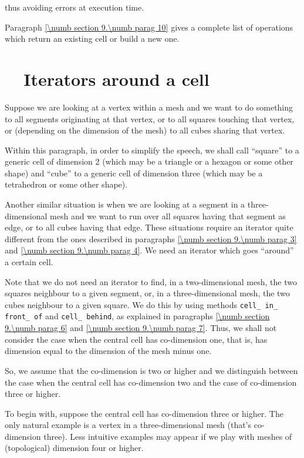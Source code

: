 \noindent thus avoiding errors at execution time.

Paragraph \ref{\numb section 9.\numb parag 10} gives a complete list of operations which return
an existing cell or build a new one.


\section{~~Iterators around a cell}\label{\numb section 9.\numb parag 8}

Suppose we are looking at a vertex within a mesh and we want to do something to all segments
originating at that vertex, or to all squares touching that vertex, or (depending on the
dimension of the mesh) to all cubes sharing that vertex.

Within this paragraph, in order to simplify the speech, we shall call ``square'' to a generic
cell of dimension 2 (which may be a triangle or a hexagon or some other shape) and
``cube'' to a generic cell of dimension three (which may be a tetrahedron or some other shape).

Another similar situation is when we are looking at a segment in a three-dimensional mesh
and we want to
run over all squares having that segment as edge, or to all cubes having that edge.
These situations require an iterator quite different from the ones described in paragraphs
\ref{\numb section 9.\numb parag 3} and \ref{\numb section 9.\numb parag 4}.
We need an iterator which goes ``around'' a certain cell.

Note that we do not need an iterator to find, in a two-dimensional mesh, the two squares
neighbour to a given segment, or, in a three-dimensional mesh, the two cubes neighbour to
a given square.
We do this by using methods {\small\tt cell\_\,in\_\,front\_\,of} and {\small\tt cell\_\,behind},
as explained in paragraphs \ref{\numb section 9.\numb parag 6} and
\ref{\numb section 9.\numb parag 7}.
Thus, we shall not consider the case when the central cell has co-dimension one, that is,
has dimension equal to the dimension of the mesh minus one.

So, we assume that the co-dimension is two or higher and we distinguish between
the case when the central cell has co-dimension two and the case of co-dimension
three or higher.

To begin with, suppose the central cell has co-dimension three or higher.
The only natural example is a vertex in a three-dimensional mesh (that's co-dimension three).
Less intuitive examples may appear if we play with meshes of (topological) dimension
four or higher.

